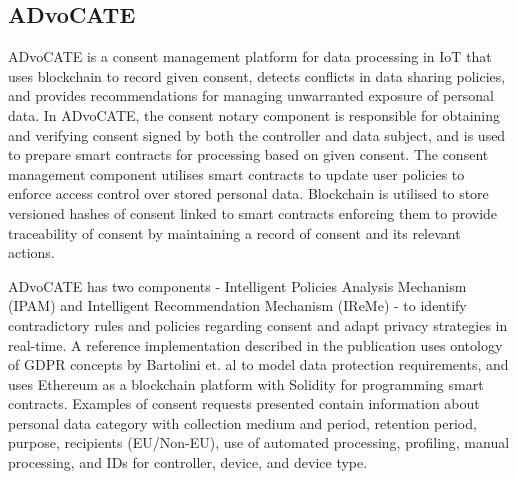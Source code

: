 \subsection*{ADvoCATE}
ADvoCATE \cite{rantos_advocate_2019} is a consent management platform for data processing in IoT that uses blockchain to record given consent, detects conflicts in data sharing policies, and provides recommendations for managing unwarranted exposure of personal data. In ADvoCATE, the consent notary component is responsible for obtaining and verifying consent signed by both the controller and data subject, and is used to prepare smart contracts for processing based on given consent. The consent management component utilises smart contracts to update user policies to enforce access control over stored personal data. Blockchain is utilised to store versioned hashes of consent linked to smart contracts enforcing them to provide traceability of consent by maintaining a record of consent and its relevant actions.

ADvoCATE has two components - Intelligent Policies Analysis Mechanism (IPAM) and Intelligent Recommendation Mechanism (IReMe) - to identify contradictory rules and policies regarding consent and adapt privacy strategies in real-time. 
A reference implementation described in the publication uses ontology of GDPR concepts by Bartolini et. al \cite{bartolini_using_2015} to model data protection requirements, and uses Ethereum as a blockchain platform with Solidity for programming smart contracts. Examples of consent requests presented contain information about personal data category with collection medium and period, retention period, purpose, recipients (EU/Non-EU), use of automated processing, profiling, manual processing, and IDs for controller, device, and device type.

